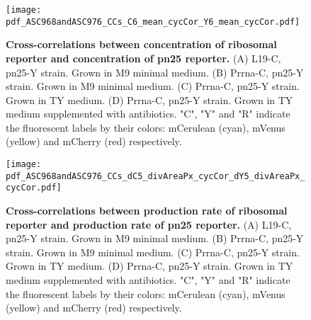 \begin{figure}
    \centering
    \texttt{[image: pdf\_ASC968andASC976\_CCs\_C6\_mean\_cycCor\_Y6\_mean\_cycCor.pdf]}
    \caption{ 
        \textbf{Cross-correlations between concentration of ribosomal reporter and concentration of pn25 reporter.}
        (A) L19-C, pn25-Y strain. Grown in M9 minimal medium.
        (B) Prrna-C, pn25-Y strain. Grown in M9 minimal medium.
        (C) Prrna-C, pn25-Y strain. Grown in TY medium.
        (D) Prrna-C, pn25-Y strain. Grown in TY medium supplemented with antibiotics.
        "C", "Y" and "R" indicate the fluorescent labels by their colors: mCerulean (cyan), mVenus (yellow) and mCherry (red) respectively.
    }
    \label{fig:ribo:CCsEERiboPn25}
\end{figure}

\begin{figure}
    \centering
    \texttt{[image: pdf\_ASC968andASC976\_CCs\_dC5\_divAreaPx\_cycCor\_dY5\_divAreaPx\_cycCor.pdf]}
    \caption{ 
        \textbf{Cross-correlations between production rate of ribosomal reporter and production rate of pn25 reporter.}
        (A) L19-C, pn25-Y strain. Grown in M9 minimal medium.
        (B) Prrna-C, pn25-Y strain. Grown in M9 minimal medium.
        (C) Prrna-C, pn25-Y strain. Grown in TY medium.
        (D) Prrna-C, pn25-Y strain. Grown in TY medium supplemented with antibiotics.
        "C", "Y" and "R" indicate the fluorescent labels by their colors: mCerulean (cyan), mVenus (yellow) and mCherry (red) respectively.
    }
    \label{fig:ribo:CCsPPRiboPn25}
\end{figure}




